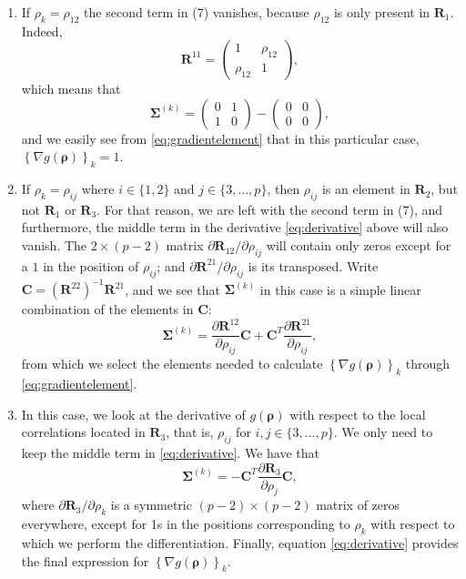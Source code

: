 \documentclass[
  12pt,
  letterpaper]{article}
\providecommand{\tightlist}{%
  \setlength{\itemsep}{0pt}\setlength{\parskip}{0pt}}
\numberwithin{equation}{section}
\newcommand{\fC}{\bm{C}}
\newcommand{\R}{\bm{R}}
\newcommand{\frho}{\bm{\rho}}
\newcommand{\fSigma}{\bm{\Sigma}}
\begin{document}
\begin{enumerate}
\def\labelenumi{\arabic{enumi}.}
\tightlist
\item
  If \(\rho_k = \rho_{12}\) the second term in (7) vanishes, because \(\rho_{12}\) is only present in \(\R_1\). Indeed,
  \[\R^{11} = \begin{pmatrix}1 & \rho_{12} \\ \rho_{12} & 1 \end{pmatrix},\]
  which means that
  \[\fSigma^{(k)} = \begin{pmatrix}0&1\\1&0\end{pmatrix} - \begin{pmatrix}0&0\\0&0\end{pmatrix},\]
  and we easily see from \eqref{eq:gradientelement} that in this particular case, \(\left\{\nabla g(\frho) \right\}_k = 1\).
\item
  If \(\rho_k = \rho_{ij}\) where \(i \in \{1,2\}\) and \(j \in \{3, \ldots,p\}\), then \(\rho_{ij}\) is an element in \(\R_2\), but not \(\R_1\) or \(\R_3\). For that reason, we are left with the second term in (7), and furthermore, the middle term in the derivative \eqref{eq:derivative} above will also vanish. The \(2\times(p-2)\) matrix \(\partial\R_{12}/\partial\rho_{ij}\) will contain only zeros except for a \(1\) in the position of \(\rho_{ij}\); and \(\partial\R^{21}/\partial\rho_{ij}\) is its transposed. Write \(\fC = \left(\R^{22}\right)^{-1}\R^{21}\), and we see that \(\fSigma^{(k)}\) in this case is a simple linear combination of the elements in \(\fC\):
  \[\fSigma^{(k)} = \frac{\partial\R^{12}}{\partial\rho_{ij}}\fC + \fC^T\frac{\partial\R^{21}}{\partial\rho_{ij}},\]
  from which we select the elements needed to calculate \(\left\{\nabla g(\frho) \right\}_k\) through \eqref{eq:gradientelement}.\\
\item
  In this case, we look at the derivative of \(g(\frho)\) with respect to the local correlations located in \(\R_3\), that is, \(\rho_{ij}\) for \(i,j \in \{3,\ldots,p\}\). We only need to keep the middle term in \eqref{eq:derivative}. We have that
  \[\fSigma^{(k)} = -\fC^T\frac{\partial\R_3}{\partial\rho_j}\fC,\]
  where \(\partial\R_3/\partial\rho_k\) is a symmetric \((p-2)\times(p-2)\) matrix of zeros everywhere, except for 1s in the positions corresponding to \(\rho_k\) with respect to which we perform the differentiation. Finally, equation \eqref{eq:derivative} provides the final expression for \(\left\{\nabla g(\frho) \right\}_k\).
\end{enumerate}
\end{document}
